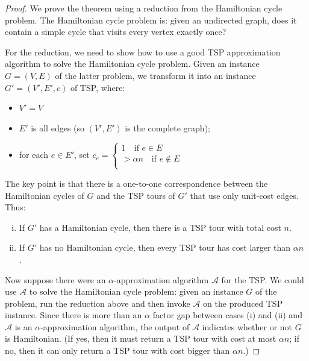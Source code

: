 \documentclass[12pt]{article}
\begin{document}
\begin{proof}

We prove the theorem using a reduction from the Hamiltonian cycle
problem. The Hamiltonian cycle problem is: given an undirected graph, does it contain a simple cycle that visits every vertex exactly once?

For the reduction, we need to show how to use a good TSP approximation algorithm to solve the Hamiltonian cycle problem. Given an instance \(G = (V, E)\) of the latter problem, we transform it into an instance \(G' = (V',E',c)\) of TSP, where:

\begin{itemize}
    \item \(V' = V\)
    \item \(E'\) is all edges (so \((V',E')\) is the complete graph);
    \item for each \(e \in E'\), set \(c_e =\begin{cases}
                                            1\quad \text{if } e\in E \\
                                            >\alpha n\quad \text{if } e\notin E\\    
                                            \end{cases}\)  
\end{itemize}


The key point is that there is a one-to-one correspondence between the Hamiltonian cycles of \(G\) and the TSP tours of \(G'\) that use only unit-cost edges. Thus:

\begin{enumerate}[(i)]
    \item If \(G'\) has a Hamiltonian cycle, then there is a TSP tour with total cost \(n\).
    \item If \(G'\) has no Hamiltonian cycle, then every TSP tour has cost larger than \(\alpha n\) .
    
       
\end{enumerate}

Now suppose there were an \(\alpha\)-approximation algorithm \(\mathcal{A}\) for the TSP. We could use \(\mathcal{A}\) to solve the Hamiltonian cycle problem: given an instance \(G\) of the problem, run the reduction
above and then invoke \(\mathcal{A}\) on the produced TSP instance. Since there is more than an \(\alpha\) factor gap between cases (i) and (ii) and \(\mathcal{A}\) is an \(\alpha\)-approximation algorithm, the output of \(\mathcal{A}\) indicates whether or not \(G\) is Hamiltonian. (If yes, then it must return a TSP tour with cost at most \(\alpha n\); if no, then it can only return a TSP tour with cost bigger than \(\alpha n\).)
\end{proof}
\end{document}
